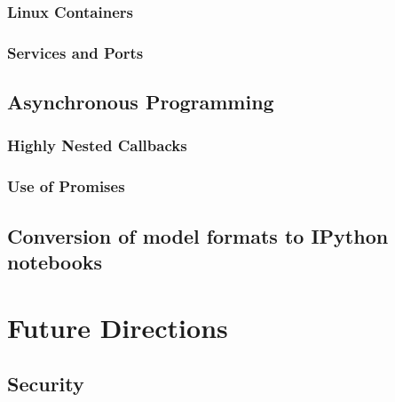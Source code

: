 \subsubsection{Linux Containers}
\subsubsection{Services and Ports}
\subsection{Asynchronous Programming}
\subsubsection{Highly Nested Callbacks}
\subsubsection{Use of Promises}
\subsection{Conversion of model formats to IPython notebooks}

\section{Future Directions}
\subsection{Security}
